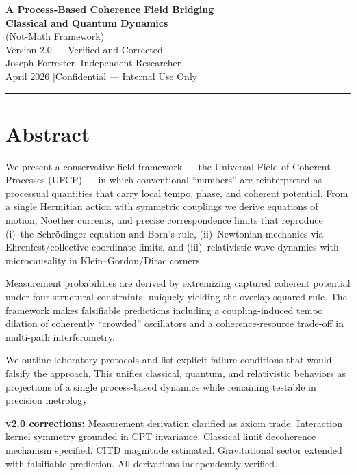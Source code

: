 \documentclass[11pt, a4paper]{article}
\begin{document}
\begin{center}
  {\LARGE \textbf{A Process-Based Coherence Field Bridging}}\\[4pt]
  {\LARGE \textbf{Classical and Quantum Dynamics}}\\[6pt]
  {\large (Not-Math Framework)}\\[8pt]
  {\color{nm-gray}\small Version 2.0 --- Verified and Corrected}\\[4pt]
  {\color{nm-gray}\small Joseph Forrester \quad|\quad Independent Researcher}\\[4pt]
  {\color{nm-gray}\small April 2026 \quad|\quad Confidential --- Internal Use Only}
\end{center}

\vspace{1em}
\hrule
\vspace{1em}

\section*{Abstract}

We present a conservative field framework --- the Universal Field of Coherent
Processes (UFCP) --- in which conventional ``numbers'' are reinterpreted as
processual quantities that carry local tempo, phase, and coherent potential.
From a single Hermitian action with symmetric couplings we derive equations
of motion, Noether currents, and precise correspondence limits that reproduce
(i)~the Schr\"odinger equation and Born's rule, (ii)~Newtonian mechanics via
Ehrenfest/collective-coordinate limits, and (iii)~relativistic wave dynamics
with microcausality in Klein--Gordon/Dirac corners.

Measurement probabilities are derived by extremizing captured coherent
potential under four structural constraints, uniquely yielding the
overlap-squared rule. The framework makes falsifiable predictions including
a coupling-induced tempo dilation of coherently ``crowded'' oscillators and
a coherence-resource trade-off in multi-path interferometry.

We outline laboratory protocols and list explicit failure conditions that
would falsify the approach. This unifies classical, quantum, and relativistic
behaviors as projections of a single process-based dynamics while remaining
testable in precision metrology.

\vspace{0.5em}
\noindent\textbf{v2.0 corrections:} Measurement derivation clarified as
axiom trade. Interaction kernel symmetry grounded in CPT invariance.
Classical limit decoherence mechanism specified. CITD magnitude estimated.
Gravitational sector extended with falsifiable prediction. All derivations
independently verified.
\end{document}
